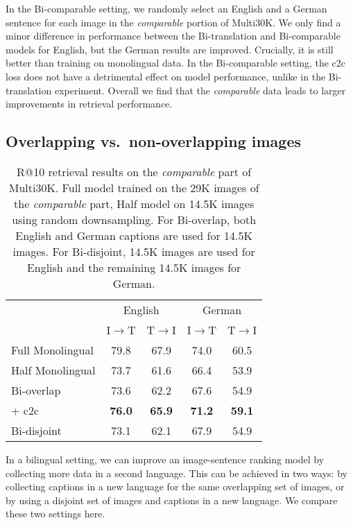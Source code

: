 In the Bi-comparable setting, we randomly select an English and a German sentence for each image in the {\it comparable} portion of Multi30K. We only find a minor difference in performance between the Bi-translation and Bi-comparable models for English, but the German results are improved. Crucially, it is still better than training on monolingual data. In the Bi-comparable setting, the c2c loss does not have a detrimental effect on model performance, unlike in the Bi-translation experiment. Overall we find that the \emph{comparable} data leads to larger improvements in retrieval performance.%



\subsection{Overlapping vs.\ non-overlapping images}
\label{sec:bioverlap}

\begin{table}
\renewcommand{\arraystretch}{1.3}
\begin{tabular}{lcccc}
\toprule
& \multicolumn{2}{c}{English} &  \multicolumn{2}{c}{German} \\
 & I$\rightarrow$T & T$\rightarrow$I & I$\rightarrow$T & T$\rightarrow$I \\
\midrule
Full Monolingual			& 79.8 & 67.9 & 74.0 & 60.5\\
Half Monolingual			& 73.7 & 61.6 & 66.4 & 53.9 \\
\midrule
Bi-overlap				& 73.6 & 62.2 & 67.6 &  54.9 \\
+ c2c 		& \bf{76.0} & \bf{65.9} & \bf{71.2}  & \bf{59.1}\\
\midrule
Bi-disjoint 	& 73.1 & 62.1 & 67.9 &  54.9\\
\bottomrule
\end{tabular}
\caption{R@10 retrieval results on the \emph{comparable} part of Multi30K. Full model trained on the 29K images of the \emph{comparable} part, Half model on 14.5K images using random downsampling. For Bi-overlap, both English and German captions are used for 14.5K images. For Bi-disjoint, 14.5K images are used for English and the remaining 14.5K images for German.}
\label{tab:half}
\end{table}

In a bilingual setting, we can improve an image-sentence ranking model by collecting more data in a second language. This can be achieved in two ways:  by collecting captions in a new language for the same overlapping set of images, or by  using a disjoint set of images and captions in a new language. We compare these two settings here.


